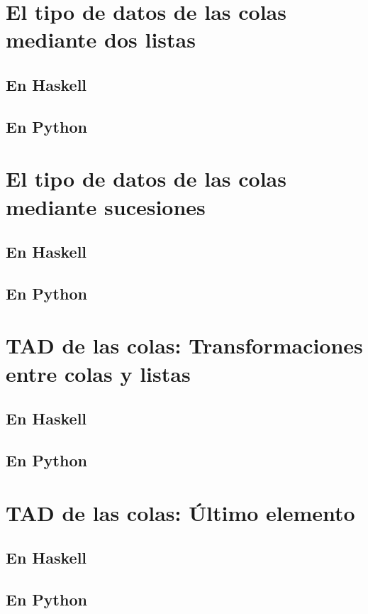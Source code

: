 \documentclass[a4paper,12pt,twoside]{book}
\begin{document}
\section{El tipo de datos de las colas mediante dos listas}
\subsection{En Haskell}
\subsection{En Python}

\section{El tipo de datos de las colas mediante sucesiones}
\subsection{En Haskell}
\subsection{En Python}

\section{TAD de las colas: Transformaciones entre colas y listas}
\subsection{En Haskell}
\subsection{En Python}

\section{TAD de las colas: Último elemento}
\subsection{En Haskell}
\subsection{En Python}
\end{document}
